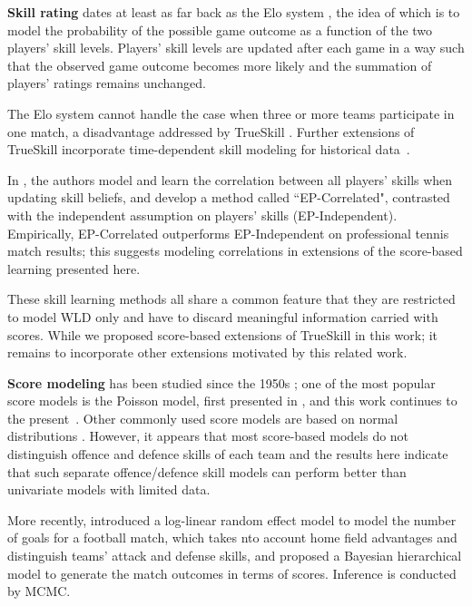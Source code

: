 {\bf Skill rating} dates at least as far back as the Elo system
\cite{elo78TheRatingOfChessPlayers}, the idea of which is to model the
probability of the possible game outcome as a function of the two
players' skill levels. Players' skill levels are updated after each
game in a way such that the observed game outcome becomes more likely
and the summation of players' ratings remains unchanged.

The Elo system cannot handle the case when three or more teams
participate in one match, a disadvantage addressed by TrueSkill
\cite{herbrich06569}. %
Further extensions of TrueSkill incorporate time-dependent
skill modeling for historical data~\cite{dangauthier07337}.


In \cite{birlutiu07ExpectationPropagation}, the authors model and learn the
correlation between all players' skills when updating skill beliefs, and
develop a method called ``EP-Correlated", contrasted with the
independent assumption on players' skills
(EP-Independent).  Empirically, EP-Correlated outperforms
EP-Independent on professional tennis match results;
this suggests modeling correlations in extensions of the
score-based learning presented here.

These skill learning methods all share a common feature that they are
restricted to model WLD only and have to discard meaningful
information carried with scores.  While we proposed score-based extensions
of TrueSkill in this work; it remains to incorporate other extensions
motivated by this related work.

{\bf Score modeling} has been studied since the 1950s
\cite{Moroney56FactsFromFigures}
\cite{dixon97ModellingAssociationFootball} \cite{Glickman98JASA}
\cite{Karlis03AnalysisOfSportsData}
\cite{karlis09BayesianModellingFootballOutcomes}; one of the most
popular score models is the Poisson model, first presented in
\cite{Moroney56FactsFromFigures}, and this work continues to the
present~\cite{karlis09BayesianModellingFootballOutcomes}. Other
commonly used score models are based on normal distributions
\cite{Glickman98JASA}. However, it appears that most score-based
models do not distinguish offence and defence skills of each team and
the results here indicate that such separate offence/defence skill
models can perform better than univariate models with limited data.

More recently, \cite{Baio:10JAS} introduced a log-linear random effect model to model the number of goals for a football match, which takes nto account home field advantages and distinguish teams' attack and defense skills, and proposed a Bayesian hierarchical model to generate the match outcomes in terms of scores. Inference is conducted by MCMC. 